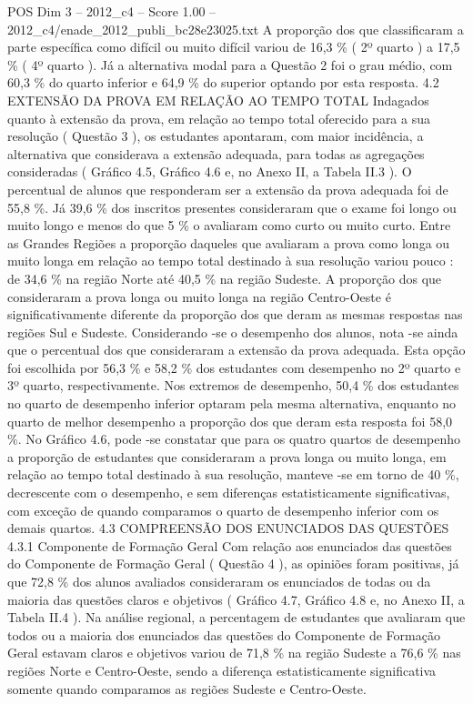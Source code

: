 \begin{textsample}{POS Dim 3 – 2012\_c4 – Score 1.00 – 2012\_c4/enade\_2012\_publi\_bc28e23025.txt}
A proporção dos que classificaram a parte específica como difícil ou muito difícil variou de 16,3 \% ( 2º quarto ) a 17,5 \% ( 4º quarto ).
Já a alternativa modal para a Questão 2 foi o grau médio, com 60,3 \% do quarto inferior e 64,9 \% do superior optando por esta resposta. 4.2 EXTENSÃO DA PROVA EM RELAÇÃO AO TEMPO TOTAL Indagados quanto à extensão da prova, em relação ao tempo total oferecido para a sua resolução ( Questão 3 ), os estudantes apontaram, com maior incidência, a alternativa que considerava a extensão adequada, para todas as agregações consideradas ( Gráfico 4.5, Gráfico 4.6 e, no Anexo II, a Tabela II.3 ).
O percentual de alunos que responderam ser a extensão da prova adequada foi de 55,8 \%.
Já 39,6 \% dos inscritos presentes consideraram que o exame foi longo ou muito longo e menos do que 5 \% o avaliaram como curto ou muito curto.
Entre as Grandes Regiões a proporção daqueles que avaliaram a prova como longa ou muito longa em relação ao tempo total destinado à sua resolução variou pouco : de 34,6 \% na região Norte até 40,5 \% na região Sudeste.
A proporção dos que consideraram a prova longa ou muito longa na região Centro-Oeste é significativamente diferente da proporção dos que deram as mesmas respostas nas regiões Sul e Sudeste.
Considerando -se o desempenho dos alunos, nota -se ainda que o percentual dos que consideraram a extensão da prova adequada.
Esta opção foi escolhida por 56,3 \% e 58,2 \% dos estudantes com desempenho no 2º quarto e 3º quarto, respectivamente.
Nos extremos de desempenho, 50,4 \% dos estudantes no quarto de desempenho inferior optaram pela mesma alternativa, enquanto no quarto de melhor desempenho a proporção dos que deram esta resposta foi 58,0 \%.
No Gráfico 4.6, pode -se constatar que para os quatro quartos de desempenho a proporção de estudantes que consideraram a prova longa ou muito longa, em relação ao tempo total destinado à sua resolução, manteve -se em torno de 40 \%, decrescente com o desempenho, e sem diferenças estatisticamente significativas, com exceção de quando comparamos o quarto de desempenho inferior com os demais quartos. 4.3 COMPREENSÃO DOS ENUNCIADOS DAS QUESTÕES 4.3.1 Componente de Formação Geral Com relação aos enunciados das questões do Componente de Formação Geral ( Questão 4 ), as opiniões foram positivas, já que 72,8 \% dos alunos avaliados consideraram os enunciados de todas ou da maioria das questões claros e objetivos ( Gráfico 4.7, Gráfico 4.8 e, no Anexo II, a Tabela II.4 ).
Na análise regional, a percentagem de estudantes que avaliaram que todos ou a maioria dos enunciados das questões do Componente de Formação Geral estavam claros e objetivos variou de 71,8 \% na região Sudeste a 76,6 \% nas regiões Norte e Centro-Oeste, sendo a diferença estatisticamente significativa somente quando comparamos as regiões Sudeste e Centro-Oeste.

\end{textsample}
